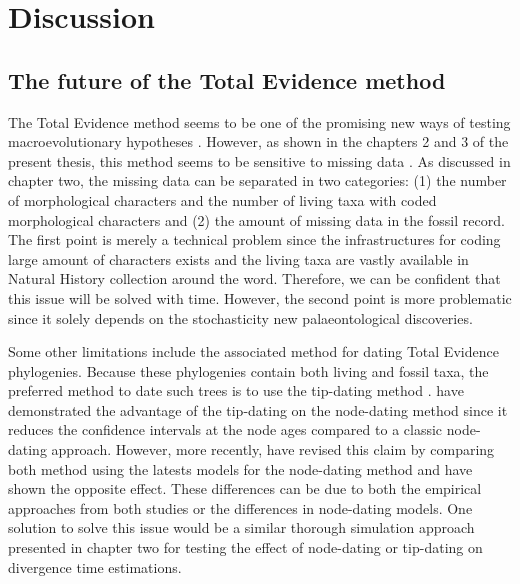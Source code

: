 \chapter{Discussion}
\label{chap:discussion}

%
% 

\section{The future of the Total Evidence method}
The Total Evidence method seems to be one of the promising new ways of testing macroevolutionary hypotheses \citep[e.g.][]{ronquista2012,slaterphylogenetic2013,Wood01032013,beckancient2014,Dembo2015}.
However, as shown in the chapters 2 and 3 of the present thesis, this method seems to be sensitive to missing data \citep{GuillermeCooper,MissingMammals}.
As discussed in chapter two, the missing data can be separated in two categories: (1) the number of morphological characters and the number of living taxa with coded morphological characters and (2) the amount of missing data in the fossil record.
The first point is merely a technical problem since the infrastructures for coding large amount of characters exists \citep[e.g.][]{morphobank,O'Leary08022013} and the living taxa are vastly available in Natural History collection around the word.
Therefore, we can be confident that this issue will be solved with time.
However, the second point is more problematic since it solely depends on the stochasticity new palaeontological discoveries.

Some other limitations include the associated method for dating Total Evidence phylogenies.
Because these phylogenies contain both living and fossil taxa, the preferred method to date such trees is to use the tip-dating method \citep[e.g.][]{ronquista2012,Wood01032013,Dembo2015}.
\cite{ronquista2012} have demonstrated the advantage of the tip-dating on the node-dating method since it reduces the confidence intervals at the node ages compared to a classic node-dating approach.
However, more recently, \cite{Arcila2015131} have revised this claim by comparing both method using the latests models for the node-dating method \citep[i.e. the fossilised birth-death model][]{heaththe2013} and have shown the opposite effect.
These differences can be due to both the empirical approaches from both studies or the differences in node-dating models.
One solution to solve this issue would be a similar thorough simulation approach presented in chapter two for testing the effect of node-dating or tip-dating on divergence time estimations.

